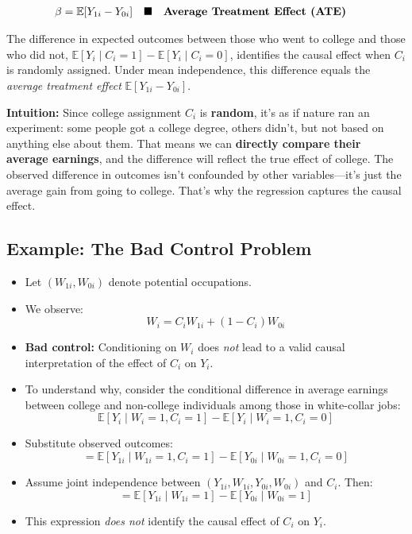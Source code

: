 \documentclass[12pt]{article}
\begin{document}
\begin{align}
\beta &= \mathbb{E}[Y_{1i} - Y_{0i}] \quad \blacksquare && \text{\textbf{Average Treatment Effect (ATE)}}
\end{align}

\doublespacing
The difference in expected outcomes between those who went to college and those who did not,  
$\mathbb{E}[Y_i \mid C_i = 1] - \mathbb{E}[Y_i \mid C_i = 0]$, identifies the causal effect when $C_i$ is randomly assigned.  
Under mean independence, this difference equals the \textit{average treatment effect} $\mathbb{E}[Y_{1i} - Y_{0i}]$.

\textbf{Intuition:}  
Since college assignment $C_i$ is \textbf{random}, it’s as if nature ran an experiment: some people got a college degree, others didn’t, but not based on anything else about them. That means we can \textbf{directly compare their average earnings}, and the difference will reflect the true effect of college. The observed difference in outcomes isn’t confounded by other variables—it’s just the average gain from going to college. That’s why the regression captures the causal effect.

\subsection*{\noindent\textbf{Example: The Bad Control Problem}}

\begin{itemize}
  \item Let $(W_{1i}, W_{0i})$ denote potential occupations.
  
  \item We observe:
  \[
  W_i = C_i W_{1i} + (1 - C_i) W_{0i}
  \]

  \item \textbf{Bad control:} Conditioning on $W_i$ does \textit{not} lead to a valid causal interpretation of the effect of $C_i$ on $Y_i$.

  \item To understand why, consider the conditional difference in average earnings between college and non-college individuals among those in white-collar jobs:
  \[
  \mathbb{E}[Y_i \mid W_i = 1, C_i = 1] - \mathbb{E}[Y_i \mid W_i = 1, C_i = 0]
  \]

  \item Substitute observed outcomes:
  \[
  = \mathbb{E}[Y_{1i} \mid W_{1i} = 1, C_i = 1] - \mathbb{E}[Y_{0i} \mid W_{0i} = 1, C_i = 0]
  \]

  \item Assume joint independence between $(Y_{1i}, W_{1i}, Y_{0i}, W_{0i})$ and $C_i$. Then:
  \[
  = \mathbb{E}[Y_{1i} \mid W_{1i} = 1] - \mathbb{E}[Y_{0i} \mid W_{0i} = 1]
  \]

  \item This expression \textit{does not} identify the causal effect of $C_i$ on $Y_i$.
\end{itemize}
\end{document}

